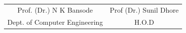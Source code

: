 \vspace*{3\baselineskip}

\begin{table}[h!]
	\centering
	\begin{tabular}{ c c }
		Prof. (Dr.) N K Bansode \hspace{35mm} & Prof (Dr.) Sunil Dhore \\
		Dept. of Computer Engineering \hspace{35mm} & H.O.D
	\end{tabular}
\end{table}

\pagebreak